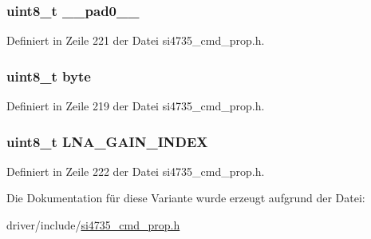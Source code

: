 \subsubsection[{\+\_\+\+\_\+pad0\+\_\+\+\_\+}]{\setlength{\rightskip}{0pt plus 5cm}uint8\+\_\+t \+\_\+\+\_\+pad0\+\_\+\+\_\+}\label{unionfm__agc__override__arg2_a8b4eebe79ded0459acec2f4950102ba3}


Definiert in Zeile 221 der Datei si4735\+\_\+cmd\+\_\+prop.\+h.

\hypertarget{unionfm__agc__override__arg2_a96f44d20f1dbf1c8785a7bc99a46164c}{}
\subsubsection[{byte}]{\setlength{\rightskip}{0pt plus 5cm}uint8\+\_\+t byte}\label{unionfm__agc__override__arg2_a96f44d20f1dbf1c8785a7bc99a46164c}


Definiert in Zeile 219 der Datei si4735\+\_\+cmd\+\_\+prop.\+h.

\hypertarget{unionfm__agc__override__arg2_a0a84cd6abd9c04a7912cb54a2a3949df}{}
\subsubsection[{L\+N\+A\+\_\+\+G\+A\+I\+N\+\_\+\+I\+N\+D\+E\+X}]{\setlength{\rightskip}{0pt plus 5cm}uint8\+\_\+t L\+N\+A\+\_\+\+G\+A\+I\+N\+\_\+\+I\+N\+D\+E\+X}\label{unionfm__agc__override__arg2_a0a84cd6abd9c04a7912cb54a2a3949df}


Definiert in Zeile 222 der Datei si4735\+\_\+cmd\+\_\+prop.\+h.



Die Dokumentation für diese Variante wurde erzeugt aufgrund der Datei\+:\begin{DoxyCompactItemize}
\item 
driver/include/\hyperlink{si4735__cmd__prop_8h}{si4735\+\_\+cmd\+\_\+prop.\+h}\end{DoxyCompactItemize}

